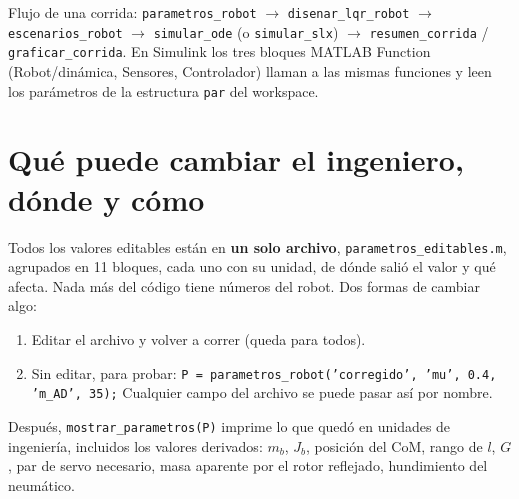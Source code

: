 \documentclass[11pt,a4paper]{article}
\newcommand{\code}[1]{\texttt{#1}}
\begin{document}
Flujo de una corrida: \code{parametros\_robot} $\to$ \code{disenar\_lqr\_robot} $\to$ \code{escenarios\_robot}
$\to$ \code{simular\_ode} (o \code{simular\_slx}) $\to$ \code{resumen\_corrida} / \code{graficar\_corrida}.
En Simulink los tres bloques MATLAB Function (Robot/dinámica, Sensores, Controlador) llaman a las mismas
funciones y leen los parámetros de la estructura \code{par} del workspace.

\section{Qué puede cambiar el ingeniero, dónde y cómo}
\label{sec:param}

Todos los valores editables están en \textbf{un solo archivo}, \code{parametros\_editables.m}, agrupados
en 11 bloques, cada uno con su unidad, de dónde salió el valor y qué afecta. Nada más del código tiene
números del robot. Dos formas de cambiar algo:
\begin{enumerate}\itemsep2pt
  \item Editar el archivo y volver a correr (queda para todos).
  \item Sin editar, para probar: \code{P = parametros\_robot('corregido', 'mu', 0.4, 'm\_AD', 35);}
  Cualquier campo del archivo se puede pasar así por nombre.
\end{enumerate}
Después, \code{mostrar\_parametros(P)} imprime lo que quedó en unidades de ingeniería, incluidos los valores
derivados: $m_b$, $J_b$, posición del CoM, rango de $l$, $G$, par de servo necesario, masa aparente por el
rotor reflejado, hundimiento del neumático.
\end{document}
